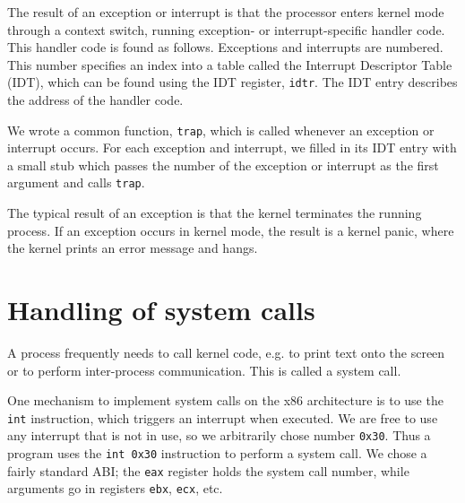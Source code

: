 \documentclass{report}
\begin{document}
The result of an exception or interrupt is that the processor enters kernel
mode through a context switch, running exception- or interrupt-specific
handler code. This handler code is found as follows. Exceptions and interrupts
are numbered. This number specifies an index into a table called the Interrupt
Descriptor Table (IDT), which can be found using the IDT register,
\texttt{idtr}. The IDT entry describes the address of the handler code. 

% 


We wrote a common function, \texttt{trap}, which is called whenever an
exception or interrupt occurs. For each exception and interrupt, we filled in
its IDT entry with a small stub which passes the number of the exception
or interrupt as the first argument and calls \texttt{trap}.

The typical result of an exception is that the kernel terminates the running
process. If an exception occurs in kernel mode, the result is a kernel panic,
where the kernel prints an error message and hangs.



\section{Handling of system calls}
A process frequently needs to call kernel code, e.g. to print text onto the
screen or to perform inter-process communication. This is called a system
call. 

One mechanism to implement system calls on the x86 architecture is to use the
\texttt{int} instruction, which triggers an interrupt when executed. We are
free to use any interrupt that is not in use, so we arbitrarily chose number
\texttt{0x30}. Thus a program uses the \texttt{int 0x30} instruction to
perform a system call. We chose a fairly standard ABI; the \texttt{eax}
register holds the system call number, while arguments go in registers
\texttt{ebx}, \texttt{ecx}, etc.
\end{document}
